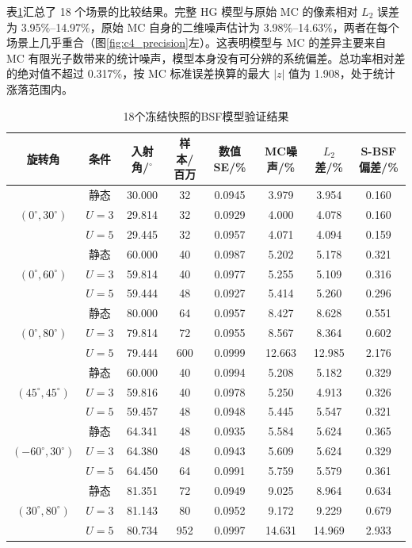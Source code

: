 表\ref{tab:c4_results}汇总了 18 个场景的比较结果。完整 HG 模型与原始 MC 的像素相对 $L_2$ 误差为 3.95\%--14.97\%，原始 MC 自身的二维噪声估计为 3.98\%--14.63\%，两者在每个场景上几乎重合（图\ref{fig:c4_precision}左）。这表明模型与 MC 的差异主要来自 MC 有限光子数带来的统计噪声，模型本身没有可分辨的系统偏差。总功率相对差的绝对值不超过 0.317\%，按 MC 标准误差换算的最大 $|z|$ 值为 1.908，处于统计涨落范围内。

\begin{table}[htbp]
\caption{18个冻结快照的BSF模型验证结果}
\label{tab:c4_results}
\centering
\small
\begin{tabular}{cccccccc}
\toprule
旋转角 & 条件 & 入射角/$^\circ$ & 样本/百万 & 数值SE/\% & MC噪声/\% & $L_2$差/\% & S-BSF偏差/\% \\
\midrule
\multirow{3}{*}{$(0^\circ,30^\circ)$} & 静态 & 30.000 & 32 & 0.0945 & 3.979 & 3.954 & 0.160 \\
 & $U=3$ & 29.814 & 32 & 0.0929 & 4.000 & 4.078 & 0.160 \\
 & $U=5$ & 29.445 & 32 & 0.0957 & 4.071 & 4.094 & 0.159 \\
\midrule
\multirow{3}{*}{$(0^\circ,60^\circ)$} & 静态 & 60.000 & 40 & 0.0987 & 5.202 & 5.178 & 0.321 \\
 & $U=3$ & 59.814 & 40 & 0.0977 & 5.255 & 5.109 & 0.316 \\
 & $U=5$ & 59.444 & 48 & 0.0927 & 5.414 & 5.260 & 0.296 \\
\midrule
\multirow{3}{*}{$(0^\circ,80^\circ)$} & 静态 & 80.000 & 64 & 0.0957 & 8.427 & 8.628 & 0.551 \\
 & $U=3$ & 79.814 & 72 & 0.0955 & 8.567 & 8.364 & 0.602 \\
 & $U=5$ & 79.444 & 600 & 0.0999 & 12.663 & 12.985 & 2.176 \\
\midrule
\multirow{3}{*}{$(45^\circ,45^\circ)$} & 静态 & 60.000 & 40 & 0.0994 & 5.208 & 5.182 & 0.329 \\
 & $U=3$ & 59.816 & 40 & 0.0978 & 5.250 & 4.913 & 0.326 \\
 & $U=5$ & 59.457 & 48 & 0.0948 & 5.445 & 5.547 & 0.321 \\
\midrule
\multirow{3}{*}{$(-60^\circ,30^\circ)$} & 静态 & 64.341 & 48 & 0.0935 & 5.584 & 5.624 & 0.365 \\
 & $U=3$ & 64.380 & 48 & 0.0943 & 5.609 & 5.624 & 0.329 \\
 & $U=5$ & 64.450 & 64 & 0.0991 & 5.759 & 5.579 & 0.361 \\
\midrule
\multirow{3}{*}{$(30^\circ,80^\circ)$} & 静态 & 81.351 & 72 & 0.0949 & 9.025 & 8.964 & 0.634 \\
 & $U=3$ & 81.143 & 80 & 0.0952 & 9.172 & 9.229 & 0.679 \\
 & $U=5$ & 80.734 & 952 & 0.0997 & 14.631 & 14.969 & 2.933 \\
\bottomrule
\end{tabular}
\end{table}

